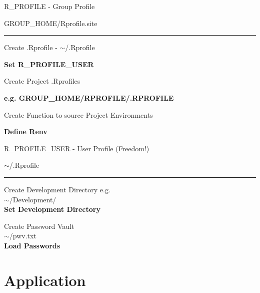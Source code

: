 \documentclass{beamer}
\begin{document}
\begin{frame}{R\_PROFILE - Group Profile}

\begin{center} GROUP\_HOME/Rprofile.site\\ \end{center}
\begin{center}
\rule{4cm}{0.6pt}
\end{center}

\begin{center}Create .Rprofile - $\sim$/.Rprofile\\\end{center}
\textbf{Set R\_PROFILE\_USER\\}

\begin{center}
 Create Project .Rprofiles\\
\end{center}
\textbf{e.g. GROUP\_HOME/RPROFILE/.RPROFILE}
\begin{center} Create Function to source Project Environments \\\end{center}
\textbf{Define Renv}
\end{frame}

\begin{frame}{R\_PROFILE\_USER - User Profile {\color{green} (Freedom!)}}

\begin{center} $\sim$/.Rprofile\\ \end{center}
\begin{center}
\rule{4cm}{0.6pt}
\end{center}

\bigskip

\begin{center}
Create Development Directory e.g.\\ $\sim$/Development/ \\ 
\textbf{Set Development Directory}
\end{center}

\begin{center}
Create Password Vault \\ $\sim$/pwv.txt \\ 
\textbf{Load Passwords}\\
\end{center}

\end{frame}

\section*{Application}
\end{document}
